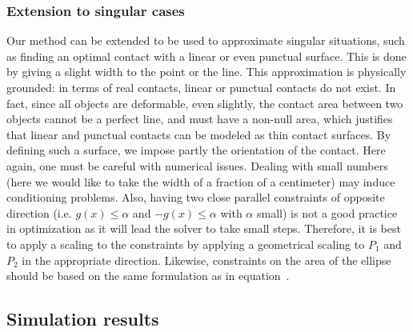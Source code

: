 \subsubsection{Extension to singular cases}
\label{subsubsec:singular_cases}
Our method can be extended to be used to approximate singular situations, such as finding an optimal contact with a linear or even punctual surface.
This is done by giving a slight width to the point or the line.
This approximation is physically grounded:
in terms of real contacts, linear or punctual contacts do not exist.
In fact, since all objects are deformable, even slightly, the contact area between two objects cannot be a perfect line, and must have a non-null area, which justifies that linear and punctual contacts can be modeled as thin contact surfaces.
By defining such a surface, we impose partly the orientation of the contact.
Here again, one must be careful with numerical issues.
Dealing with small numbers (here we would like to take the width of a fraction of a centimeter) may induce conditioning problems.
Also, having two close parallel constraints of opposite direction (i.e. $g(x)\leq \alpha$ and  $-g(x)\leq \alpha$ with $\alpha$ small) is not a good practice in optimization as it will lead the solver to take small steps.
Therefore, it is best to apply a scaling to the constraints by applying a geometrical scaling to $P_1$ and $P_2$ in the appropriate direction.\newline
Likewise, constraints on the area of the ellipse should be based on the same formulation as in equation~.



\subsection{Simulation results}
\label{subsec:simu}

